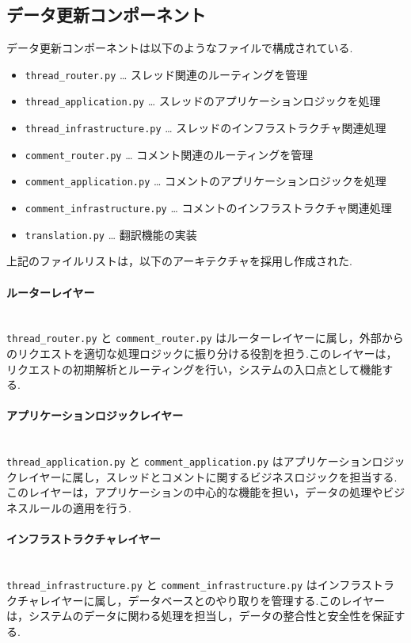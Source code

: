 \documentclass[b5paper,12pt,dvipdfmx]{jsreport}
\newcommand{\red}[1]{\textcolor{red}{#1}}
\begin{document}
\subsection*{データ更新コンポーネント}

データ更新コンポーネントは以下のようなファイルで構成されている.

\begin{itemize}
    \item \texttt{thread\_router.py} … スレッド関連のルーティングを管理
    \item \texttt{thread\_application.py} … スレッドのアプリケーションロジックを処理
    \item \texttt{thread\_infrastructure.py} … スレッドのインフラストラクチャ関連処理
    \item \texttt{comment\_router.py} … コメント関連のルーティングを管理
    \item \texttt{comment\_application.py} … コメントのアプリケーションロジックを処理
    \item \texttt{comment\_infrastructure.py} … コメントのインフラストラクチャ関連処理
    \item \texttt{translation.py} … 翻訳機能の実装
\end{itemize}


上記のファイルリストは，以下のアーキテクチャを採用し作成された.

\paragraph{ルーターレイヤー}\mbox{}\\
\texttt{thread\_router.py} と \texttt{comment\_router.py} はルーターレイヤーに属し，外部からのリクエストを適切な処理ロジックに振り分ける役割を担う.このレイヤーは，リクエストの初期解析とルーティングを行い，システムの入口点として機能する.

\paragraph{アプリケーションロジックレイヤー}\mbox{}\\
\texttt{thread\_application.py} と \texttt{comment\_application.py} はアプリケーションロジックレイヤーに属し，スレッドとコメントに関するビジネスロジックを担当する.このレイヤーは，アプリケーションの中心的な機能を担い，データの処理やビジネスルールの適用を行う.

\paragraph{インフラストラクチャレイヤー}\mbox{}\\
\texttt{thread\_infrastructure.py} と \texttt{comment\_infrastructure.py} はインフラストラクチャレイヤーに属し，データベースとのやり取りを管理する.このレイヤーは，システムのデータに関わる処理を担当し，データの整合性と安全性を保証する.
\end{document}
